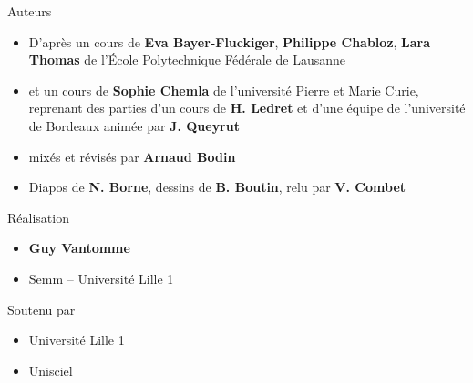 \begin{frame}
\begin{minipage}{0.90\textwidth}
   \smallskip
   
  Auteurs
  \begin{itemize}
  \item D'après un cours de {\bf Eva Bayer-Fluckiger}, {\bf Philippe Chabloz}, {\bf Lara Thomas}
  de l'\'Ecole Polytechnique Fédérale de Lausanne

  \item et un cours de {\bf Sophie Chemla} de l'université Pierre et Marie Curie,  
  reprenant des parties d'un cours de {\bf H. Ledret} et d'une équipe de l'université de 
  Bordeaux animée par {\bf J. Queyrut}
  
  \item mixés et révisés par {\bf Arnaud Bodin}  
  
  \item Diapos de {\bf N. Borne}, dessins de {\bf B. Boutin}, relu par {\bf V. Combet} 
    
  \end{itemize}

  \smallskip

  Réalisation
  \begin{itemize}
    \item {\bf Guy Vantomme}
    \item Semm -- Université Lille 1
  \end{itemize}

  \smallskip

  Soutenu par 
  \begin{itemize}
    \item Université Lille 1
    \item Unisciel
  \end{itemize}

  \end{minipage}  



\end{frame}


